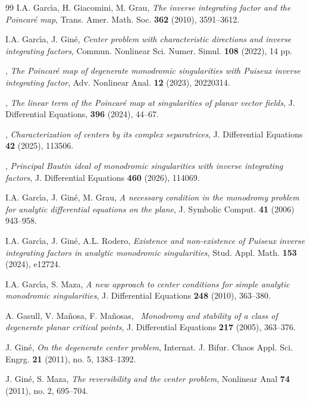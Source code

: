 \documentclass[12pt]{amsart}
\begin{document}
\begin{thebibliography}{99}
 {\sc I.A. Garc\'{\i}a, H. Giacomini, M. Grau}, {\it The inverse integrating factor and the Poincar\'e map}, Trans. Amer. Math. Soc. {\bf 362} (2010), 3591--3612.

 {\sc I.A. Garc\' \i a, J. Gin\'e},  {\it Center problem with characteristic directions and inverse integrating factors}, Commun. Nonlinear Sci. Numer. Simul. {\bf 108} (2022), 14 pp.

, {\it The Poincar\'e map of degenerate monodromic singularities with Puiseux inverse integrating factor}, Adv. Nonlinear Anal. {\bf 12} (2023), 20220314.

, {\it The linear term of the Poincar\'e map at singularities of planar vector fields}, J. Differential Equations, {\bf 396} (2024), 44--67.

, {\it Characterization of centers by its complex separatrices}, J. Differential Equations {\bf 42} (2025), 113506.

, {\it Principal Bautin ideal of monodromic singularities with inverse integrating factors}, J. Differential Equations {\bf 460} (2026), 114069.

 {\sc I.A. Garc\' \i a, J. Gin\'e, M. Grau}, {\it A necessary condition in the monodromy problem for analytic differential equations on the plane}, J. Symbolic Comput. {\bf 41} (2006) 943--958.

 {\sc I.A. Garc\' \i a, J. Gin\'e, A.L. Rodero}, {\it Existence and non-existence of Puiseux inverse integrating factors in analytic monodromic singularities}, Stud. Appl. Math. {\bf 153} (2024), e12724.

 {\sc I.A. Garc\' \i a, S. Maza}, {\it A new approach to center conditions for simple analytic monodromic singularities}, J. Differential Equations {\bf 248} (2010), 363--380.

 {\sc A. Gasull, V. Ma\~{n}osa, F. Ma\~{n}osas,} {\it \ Monodromy and stability of a class
    of degenerate planar critical points}, J. Differential Equations {\bf 217} (2005), 363--376.

 {\sc J. Gin\'e}, {\it On the degenerate center problem}, Internat. J. Bifur. Chaos Appl. Sci. Engrg. {\bf 21} (2011), no. 5, 1383--1392.

 {\sc J. Gin\'e, S. Maza}, {\it The reversibility and the center problem}, Nonlinear Anal {\bf 74} (2011), no. 2, 695--704.


\end{thebibliography}
\end{document}
